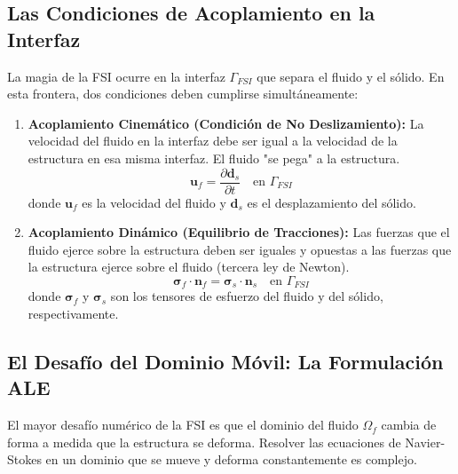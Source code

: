 \subsection{Las Condiciones de Acoplamiento en la Interfaz}
La magia de la FSI ocurre en la interfaz \(\Gamma_{FSI}\) que separa el fluido y el sólido. En esta frontera, dos condiciones deben cumplirse simultáneamente:
\begin{enumerate}
    \item \textbf{Acoplamiento Cinemático (Condición de No Deslizamiento):} La velocidad del fluido en la interfaz debe ser igual a la velocidad de la estructura en esa misma interfaz. El fluido "se pega" a la estructura.
    \begin{equation}
        \bm{u}_f = \frac{\partial \bm{d}_s}{\partial t} \quad \text{en } \Gamma_{FSI}
        \label{eq:fsi-kinematic}
    \end{equation}
    donde \(\bm{u}_f\) es la velocidad del fluido y \(\bm{d}_s\) es el desplazamiento del sólido.
    \item \textbf{Acoplamiento Dinámico (Equilibrio de Tracciones):} Las fuerzas que el fluido ejerce sobre la estructura deben ser iguales y opuestas a las fuerzas que la estructura ejerce sobre el fluido (tercera ley de Newton).
    \begin{equation}
        \bm{\sigma}_f \cdot \bm{n}_f = \bm{\sigma}_s \cdot \bm{n}_s \quad \text{en } \Gamma_{FSI}
        \label{eq:fsi-dynamic}
    \end{equation}
    donde \(\bm{\sigma}_f\) y \(\bm{\sigma}_s\) son los tensores de esfuerzo del fluido y del sólido, respectivamente.
\end{enumerate}

\subsection{El Desafío del Dominio Móvil: La Formulación ALE}
El mayor desafío numérico de la FSI es que el dominio del fluido \(\Omega_f\) cambia de forma a medida que la estructura se deforma. Resolver las ecuaciones de Navier-Stokes en un dominio que se mueve y deforma constantemente es complejo.


